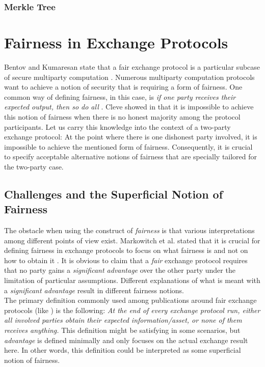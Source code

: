 \documentclass{cacthesis}
\newcounter{protocol}
\begin{document}
        \subsection{Merkle Tree}

    \chapter{Fairness in Exchange Protocols}
        Bentov and Kumaresan state that a fair exchange protocol is a particular subcase of secure multiparty computation \cite{10.1007/978-3-662-44381-1_24}. Numerous multiparty computation protocols want to achieve a notion of security that is requiring a form of fairness. One common way of defining fairness, in this case, is \textit{if one party receives their expected output, then so do all} \cite{10.1007/978-3-540-79263-5_8}. Cleve showed in \cite{10.1145/12130.12168} that it is impossible to achieve this notion of fairness when there is no honest majority among the protocol participants. Let us carry this knowledge into the context of a two-party exchange protocol: At the point where there is one dishonest party involved, it is impossible to achieve the mentioned form of fairness. Consequently, it is crucial to specify acceptable alternative notions of fairness that are specially tailored for the two-party case. 
        
        \section{Challenges and the Superficial Notion of Fairness}
		The obstacle when using the construct of \textit{fairness} is that various interpretations among different points of view exist. Markowitch et al. stated that it is crucial for defining fairness in exchange protocols to focus on what fairness is and not on how to obtain it \cite{10.1007/3-540-36552-4_31}. It is obvious to claim that a \textit{fair} exchange protocol requires that no party gains a \textit{significant advantage} over the other party under the limitation of particular assumptions. Different explanations of what is meant with a \textit{significant advantage} result in different fairness notions. \\
        The primary definition commonly used among publications around fair exchange protocols (like \cite{10.1145/266420.266426} \cite{asyncOptiFairEx1998} \cite{remarksOnFairEx2000})  is the following: \textit{At the end of every exchange protocol run, either all involved parties obtain their expected information/asset, or none of them receives anything.} This definition might be satisfying in some scenarios, but \textit{advantage} is defined minimally and only focuses on the actual exchange result here. In other words, this definition could be interpreted as some superficial notion of fairness.
        
\end{document}
